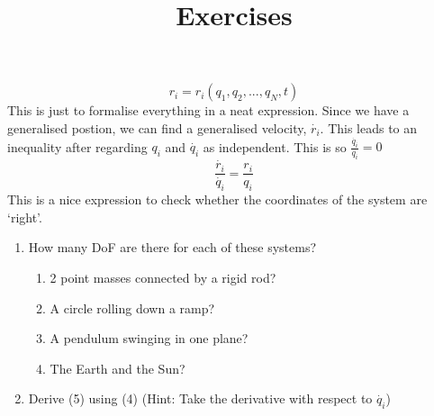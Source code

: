 \begin{equation}
r_{i} = r_{i}(q_{1}, q_{2}, ..., q_{N}, t)
\end{equation}
This is just to formalise everything in a neat expression. Since we have a generalised postion, we can find a generalised velocity, $\dot{r_{i}}$. This leads to an inequality after regarding $q_{i}$ and $\dot{q_{i}}$ as independent. This is so $\frac{\dot{q_{i}}}{q_{i}} =  0$
\begin{equation}
 \frac{\dot{r_{i}}}{\dot{q_{i}}} =  \frac{r_{i}}{q_{i}} 
\end{equation}
This is a nice expression to check whether the coordinates of the system are `right'.
\par


 

\title{\large{Exercises}}
\begin{enumerate}
	\item How many DoF are there for each of these systems?
	\begin{enumerate}
		\item 2 point masses connected by a rigid rod? 
		\item A circle rolling down a ramp?
		\item A pendulum swinging in one plane?
		\item The Earth and the Sun? 
	\end{enumerate}
	\item Derive (5) using (4) (Hint: Take the derivative with respect to $\dot{q_{i}}$)

\end{enumerate}


